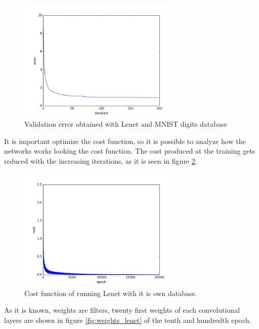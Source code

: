 \begin{figure}[htb]
\centering
\includegraphics[width=0.7\textwidth]{images/ModificandoLenet/error_lenet.png}
\caption{Validation error obtained with Lenet and MNIST digits database} \label{fig:Lenetresult}
\end{figure}

It is important optimize the cost function, so it is possible to analyze how the networks works looking the cost function. The cost produced at the training gets reduced with the increasing iterations, as it is seen in figure \ref{fig:Lenetcost}.\\

\begin{figure}[htb]
\centering
\includegraphics[width=0.7\textwidth]{images/images_lenet/cost_lenet.png}
\caption{Cost function of running Lenet with it is own database.} \label{fig:Lenetcost}
\end{figure}

As it is known, weights are filters, twenty first weights of each convolutional layers are shown in figure \ref{fig:weights_lenet} of the tenth and hundredth epoch.\\

